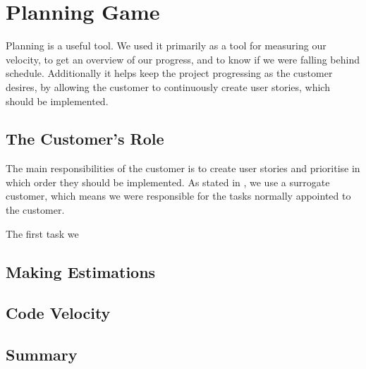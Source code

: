 \section{Planning Game}
Planning is a useful tool.
We used it primarily as a tool for measuring our velocity, to get an overview of our progress, and to know if we were falling behind schedule.
Additionally it helps keep the project progressing as the customer desires, by allowing the customer to continuously create user stories, which should be implemented.

\subsection{The Customer's Role}
The main responsibilities of the customer is to create user stories and prioritise in which order they should be implemented.
As stated in , we use a surrogate customer, which means we were responsible  for the tasks normally appointed to the customer.

The first task we 

\subsection{Making Estimations}

\subsection{Code Velocity}

\subsection{Summary}
